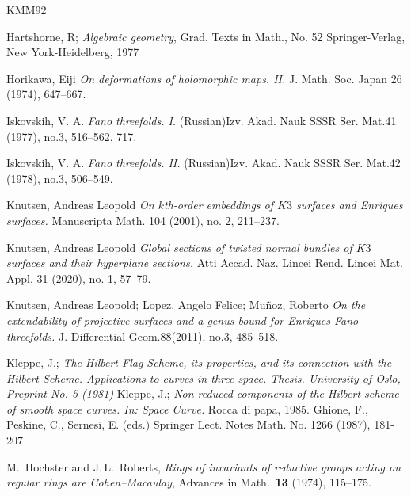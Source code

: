 \documentclass[11pt,twoside]{amsart}
\theoremstyle{plain}
\numberwithin{equation}{section}
\theoremstyle{definition}
\begin{document}
\begin{thebibliography}{KMM92}
\color{black}


Hartshorne, R; \emph{Algebraic geometry}, 
Grad. Texts in Math., No. 52
Springer-Verlag, New York-Heidelberg, 1977

\color{black}

Horikawa, Eiji
\emph{On deformations of holomorphic maps. II.}
J. Math. Soc. Japan 26 (1974), 647–667.



Iskovskih, V. A.
\emph{Fano threefolds. I.}
(Russian)Izv. Akad. Nauk SSSR Ser. Mat.41 (1977), no.3, 516–562, 717.

Iskovskih, V. A.
\emph{Fano threefolds. II.}
(Russian)Izv. Akad. Nauk SSSR Ser. Mat.42 (1978), no.3, 506–549.



Knutsen, Andreas Leopold
\emph{On $k$th-order embeddings of $K3$ surfaces and Enriques surfaces.}
Manuscripta Math. 104 (2001), no. 2, 211–237.

Knutsen, Andreas Leopold
\emph{Global sections of twisted normal bundles of $K3$ surfaces and their hyperplane sections.}
Atti Accad. Naz. Lincei Rend. Lincei Mat. Appl. 31 (2020), no. 1, 57–79.


Knutsen, Andreas Leopold; Lopez, Angelo Felice; Muñoz, Roberto
\emph{On the extendability of projective surfaces and a genus bound for Enriques-Fano threefolds.}
J. Differential Geom.88(2011), no.3, 485–518.

Kleppe, J.; 
\emph{The Hilbert Flag Scheme, its properties, and its connection with the Hilbert Scheme. Applications to curves in three-space. Thesis. University of Oslo, Preprint No. 5 (1981)}
Kleppe, J.;
\emph{Non-reduced components of the Hilbert scheme of smooth space curves. In: Space Curve.}
Rocca di papa, 1985. Ghione, F., Peskine, C., Sernesi, E. (eds.) Springer Lect. Notes Math. No. 1266 (1987), 181-207

 M.~Hochster and J.\,L.~Roberts, \emph{Rings of invariants of reductive groups acting on regular rings are Cohen--Macaulay}, Advances in Math.\ \textbf{13} (1974), 115--175.
 

\end{thebibliography}
\end{document}
